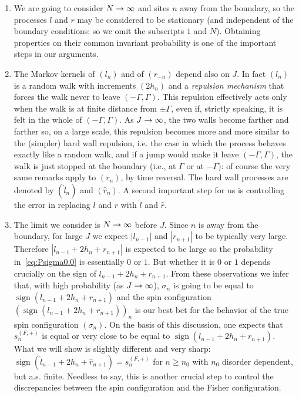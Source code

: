 \documentclass[10pt]{amsart}
\theoremstyle{definition}\newtheorem{defi}[theo]{Definition}\newtheorem{rema}[theo]{Remark}\newtheorem{exam}[theo]{Example}\newtheorem{exem}[theo]{Example}\newtheorem{nota}[theo]{Notation}
\newcommand{\gG}{\Gamma}
\newcommand{\gs}{\sigma}
\newcommand{\ls}{\widehat{l}}
\newcommand{\rs}{\widehat{r}}
\DeclareMathOperator{\sign}{\mathrm{sign}}
\renewcommand*{\to}{\mathchoice{\longrightarrow}{\rightarrow}{\rightarrow}{\rightarrow}}
\begin{document}
\begin{enumerate}
\item We are going to consider $N \to \infty$ and sites $n$ away from the boundary, so the processes $l$ and $r$ may be considered to be stationary (and independent of the boundary conditions: so we omit the subscripts $1$ and $N$). Obtaining properties on their common invariant probability is one of the important steps in our arguments.
\item The Markov kernels of $(l_n)$ and of $(r_{-n})$ depend also on $J$. In fact $(l_n)$ is a random walk with increments $(2 h_n)$ and a \emph{repulsion mechanism} that forces the walk never to leave $(-\gG, \gG)$. This repulsion effectively acts only when the walk is at finite distance from $\pm \gG$, even if, strictly speaking, it is felt in the whole of $(-\gG, \gG)$. As $J \to \infty$, the two walls become farther and farther so, on a large scale, this repulsion becomes more and more similar to the (simpler) hard wall repulsion, i.e. the case in which the process behaves exactly like a random walk, and if a jump would make it leave $(-\gG, \gG)$, the walk is just stopped at the boundary (i.e., at $\gG$ or at $-\gG$): of course the very same remarks apply to $(r_n)$, by time reversal. The hard wall processes are denoted by $(\widehat l _n)$ and $(\widehat r _n )$. A second important step for us is controlling the error in replacing $l$ and $r$ with $\ls$ and $\rs$.
\item The limit we consider is $N \to \infty$ before $J$. Since $n$ is away from the boundary, for large $J$ we expect $| l_{n-1}|$ and $| r_{n+1}|$ to be typically very large. Therefore $| l_{n-1}+2h_n+r_{n+1}|$ is expected to be large so the probability in~\eqref{eq:Psigma0.0} is essentially $0$ or $1$. But whether it is $0$ or $1$ depends crucially on the sign of $l_{n-1}+2 h_n + r_{n+1}$. From these observations we infer that, with high probability (as $J\to \infty$), $\gs_n$ is going to be equal to $\sign(l_{n-1}+2 h_n + r_{n+1})$ and the spin configuration $(\sign(l_{n-1}+2 h_n + r_{n+1}))_n$ is our best bet for the behavior of the true spin configuration $(\gs_n)$. On the basis of this discussion, one expects that $s^{(F,+)}_n$ is equal or very close to be equal to $\sign(l_{n-1}+2 h_n + r_{n+1})$. What we will show is slightly different and very sharp: $\sign(\ls_{n-1} +2h_n+ \widehat r_{n+1})=s^{(F,+)}_n$ for $n\ge n_0$ with $n_0$ disorder dependent, but a.s. finite. Needless to say, this is another crucial step to control the discrepancies between the spin configuration and the Fisher configuration.
\end{enumerate}
\end{document}
